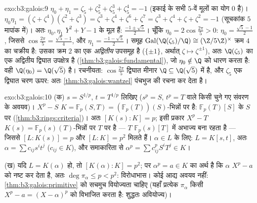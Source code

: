\begin{solution}{exo:b3:galois:9}
$\eta_0 + \eta_1 = \zeta_5 + \zeta_5^2 + \zeta_5^3 + \zeta_5^4 =
-1$ (इकाई के सभी $5$-वें मूलों का योग $0$ है)। $\eta_0\eta_1 =
(\zeta + \zeta^4)(\zeta^2 + \zeta^3) = \zeta^3 + \zeta^4 +
\zeta^6 + \zeta^7 = \zeta^3 + \zeta^4 + \zeta + \zeta^2 = -1$ (सूचकांक
$5$ मापांक में)। अतः $\eta_0, \eta_1$ $Y^2 + Y
- 1$ के मूल हैं: $\frac{-1 \pm \sqrt5}2$। चूँकि $\eta_0 =
2\cos\frac{2\pi}5 > 0$:
$\eta_0 = \frac{\sqrt5 - 1}2$, जिससे $\cos\frac{2\pi}5 = \frac{\sqrt5 - 1}4$, और $\eta_1 =
\frac{-1-\sqrt5}2$। समूह $\operatorname{Gal}(\Q(\zeta_5)/\Q) \cong (\Z/5\Z)^\times$ क्रम $4$ का चक्रीय है:
उसका क्रम $2$ का एक \emph{अद्वितीय} उपसमूह है ($\{\pm 1\}$, अर्थात्
$\zeta \mapsto \zeta^{\pm1}$), अतः $\Q(\zeta_5)$ का एक अद्वितीय द्विघात उपक्षेत्र है (\cref{thm:b3:galois:fundamental}), जो
$\eta_0
\notin \Q$ को धारण करता है: वही $\Q(\eta_0) = \Q(\sqrt5)$ है। रचनीयता: $\cos\frac{2\pi}5$ द्विघात मीनार
$\Q \subseteq
\Q(\sqrt5)$ में है, और $\zeta_5$ एक द्विघात चरण ऊपर: अतः \cref{thm:b3:galois:wantzel} पंचभुज की रचना
कर देता है।
\end{solution}

\begin{solution}{exo:b3:galois:10}
(क) $s = S^{1/p}$, $t = T^{1/p}$ लिखिए ($s^p = S$, $t^p = T$ वाले किसी चुने गए  संवरण
के अवयव)। $X^p - S$ $K = \mathbb F_p(S, T) = (\mathbb
F_p(T))(S)$-भिन्नों पर  है:  $\mathbb F_p(T)[S]$ के  $S$ पर  (\cref{thm:b3:rings:criteria})। अतः $[K(s):K] = p$; इसी प्रकार $X^p - T$
$K(s) = \mathbb F_p(s)(T)$-भिन्नों पर $T$ पर  है --- $T$ $\mathbb F_p(s)[T]$ में अभाज्य
बना रहता है --- जिससे $[L : K(s)] = p$ और $[L:K] =
p^2$ मिलते हैं। $\alpha \in L$ के लिए: $L = K[s, t]$,
अतः $\alpha = \sum
c_{ij}s^it^j$ ($c_{ij} \in K$), और  समाकारिता से $\alpha^p = \sum c_{ij}^p S^iT^j \in K$।

(ख) यदि $L = K(\alpha)$ हो, तो $[K(\alpha):K] = p^2$; पर $\alpha^p = a \in K$ का अर्थ है कि $\alpha$ $X^p - a$ को
नष्ट कर देता है, अतः $\deg\pi_\alpha \leq p < p^2$: विरोधाभास। कोई आद्य अवयव नहीं: \cref{thm:b3:galois:primitive}
को सचमुच वियोज्यता चाहिए (यहाँ प्रत्येक $\pi_\alpha$ किसी $X^p - a =
(X - \alpha)^p$ को विभाजित
करता है: शुद्धतः अवियोज्य)।
\end{solution}

